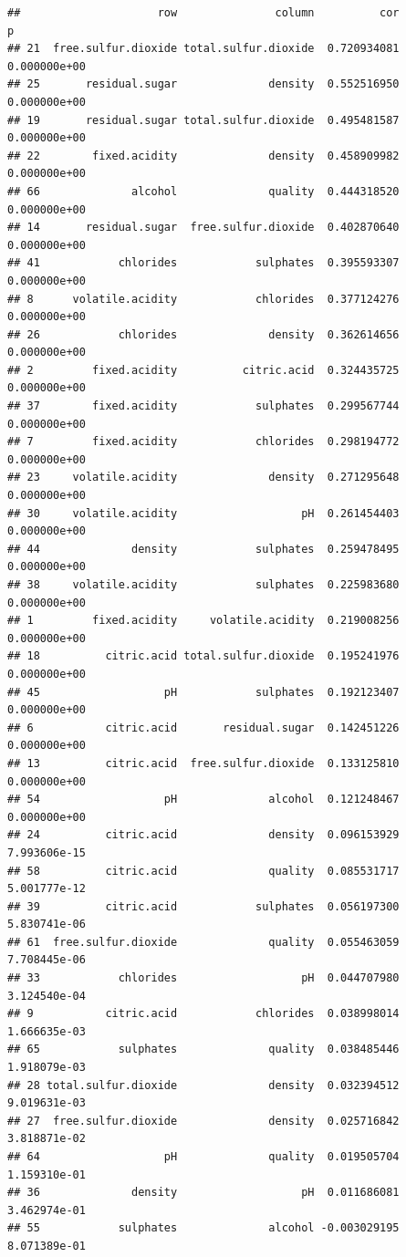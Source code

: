 \documentclass[
]{book}
\begin{document}
\begin{verbatim}
##                     row               column          cor            p
## 21  free.sulfur.dioxide total.sulfur.dioxide  0.720934081 0.000000e+00
## 25       residual.sugar              density  0.552516950 0.000000e+00
## 19       residual.sugar total.sulfur.dioxide  0.495481587 0.000000e+00
## 22        fixed.acidity              density  0.458909982 0.000000e+00
## 66              alcohol              quality  0.444318520 0.000000e+00
## 14       residual.sugar  free.sulfur.dioxide  0.402870640 0.000000e+00
## 41            chlorides            sulphates  0.395593307 0.000000e+00
## 8      volatile.acidity            chlorides  0.377124276 0.000000e+00
## 26            chlorides              density  0.362614656 0.000000e+00
## 2         fixed.acidity          citric.acid  0.324435725 0.000000e+00
## 37        fixed.acidity            sulphates  0.299567744 0.000000e+00
## 7         fixed.acidity            chlorides  0.298194772 0.000000e+00
## 23     volatile.acidity              density  0.271295648 0.000000e+00
## 30     volatile.acidity                   pH  0.261454403 0.000000e+00
## 44              density            sulphates  0.259478495 0.000000e+00
## 38     volatile.acidity            sulphates  0.225983680 0.000000e+00
## 1         fixed.acidity     volatile.acidity  0.219008256 0.000000e+00
## 18          citric.acid total.sulfur.dioxide  0.195241976 0.000000e+00
## 45                   pH            sulphates  0.192123407 0.000000e+00
## 6           citric.acid       residual.sugar  0.142451226 0.000000e+00
## 13          citric.acid  free.sulfur.dioxide  0.133125810 0.000000e+00
## 54                   pH              alcohol  0.121248467 0.000000e+00
## 24          citric.acid              density  0.096153929 7.993606e-15
## 58          citric.acid              quality  0.085531717 5.001777e-12
## 39          citric.acid            sulphates  0.056197300 5.830741e-06
## 61  free.sulfur.dioxide              quality  0.055463059 7.708445e-06
## 33            chlorides                   pH  0.044707980 3.124540e-04
## 9           citric.acid            chlorides  0.038998014 1.666635e-03
## 65            sulphates              quality  0.038485446 1.918079e-03
## 28 total.sulfur.dioxide              density  0.032394512 9.019631e-03
## 27  free.sulfur.dioxide              density  0.025716842 3.818871e-02
## 64                   pH              quality  0.019505704 1.159310e-01
## 36              density                   pH  0.011686081 3.462974e-01
## 55            sulphates              alcohol -0.003029195 8.071389e-01

\end{verbatim}
\end{document}
